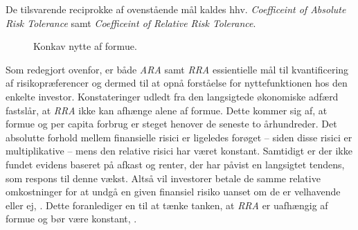 \documentclass[
  a4paper,
  oneside]{memoir}
\begin{document}
De tilsvarende reciprokke af ovenstående mål kaldes hhv. \emph{Coefficeint of Absolute Risk Tolerance} samt \emph{Coefficeint of Relative Risk Tolerance}.

\begin{figure}[ht]
\centering
{}
\caption{Konkav nytte af formue.}
\label{fig:Nyt}
\end{figure}

Som redegjort ovenfor, er både \emph{ARA} samt \emph{RRA} essientielle mål til kvantificering af risikopræferencer og dermed til at opnå forståelse for nyttefunktionen hos den enkelte investor. Konstateringer udledt fra den langsigtede økonomiske adfærd fastslår, at \emph{RRA} ikke kan afhænge alene af formue. Dette kommer sig af, at formue og per capita forbrug er steget henover de seneste to århundreder. Det absolutte forhold mellem finansielle risici er ligeledes forøget -- siden disse risici er multiplikative -- mens den relative risici har været konstant. Samtidigt er der ikke fundet evidens baseret på afkast og renter, der har påvist en langsigtet tendens, som respons til denne vækst. Altså vil investorer betale de samme relative omkostninger for at undgå en given finansiel risiko uanset om de er velhavende eller ej, \citep{CampVic2003}. Dette foranlediger en til at tænke tanken, at \emph{RRA} er uafhængig af formue og bør være konstant, \citep{Chiappori2008}.
\end{document}
